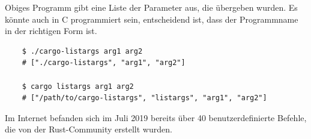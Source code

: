 Obiges Programm gibt eine Liste der Parameter aus, die übergeben wurden. Es könnte auch in C programmiert sein, entscheidend ist, dass der Programmname in der richtigen Form ist.

\begin{lstlisting}
    $ ./cargo-listargs arg1 arg2
    # ["./cargo-listargs", "arg1", "arg2"]

    $ cargo listargs arg1 arg2
    # ["/path/to/cargo-listargs", "listargs", "arg1", "arg2"]
\end{lstlisting}

Im Internet befanden sich im Juli 2019 bereits über 40 benutzerdefinierte Befehle, die von der Rust-Community erstellt wurden. \cite{CargoSubcommands}
